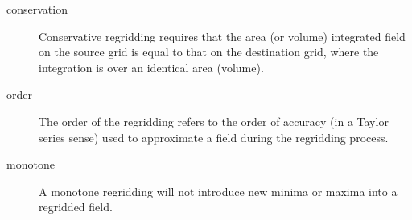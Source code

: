 
%
% 
%
%
%

\begin{description}

\item [conservation] \label{glos:conservation} 
      Conservative regridding requires that the area (or volume)
      integrated field on the source grid is equal to that on
      the destination grid, where the integration is over an
      identical area (volume).

\item [order] \label{glos:order}
      The order of the regridding refers to the order of accuracy
      (in a Taylor series sense) used to approximate a field during
      the regridding process.

\item [monotone] \label{glos:monotone}
      A monotone regridding will not introduce new minima or
      maxima into a regridded field.

\end{description}

